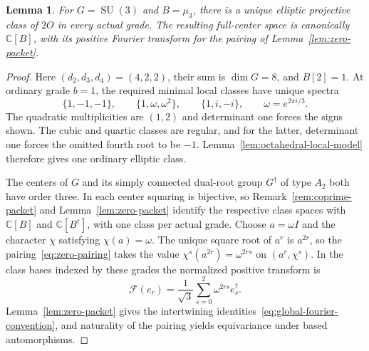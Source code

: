 \documentclass[11pt,a4paper,reqno]{amsart}
\theoremstyle{plain}
\newtheorem{lemma}[theorem]{Lemma}
\theoremstyle{definition}
\theoremstyle{remark}
\numberwithin{equation}{section}
\newcommand{\SU}{\operatorname{SU}}
\newcommand{\CC}{\mathbb C}
\begin{document}
\begin{lemma}\label{lem:octahedral-su3}
For $G=\SU(3)$ and $B=\mu_3$, there is a unique elliptic projective class of $2O$ in every actual grade. The resulting full-center space is canonically $\CC[B]$, with its positive Fourier transform for the pairing of Lemma~\ref{lem:zero-packet}.
\end{lemma}
\begin{proof}
Here $(d_2,d_3,d_4)=(4,2,2)$, their sum is $\dim G=8$, and $B[2]=1$. At ordinary grade $b=1$, the required minimal local classes have unique spectra
\[
\{1,-1,-1\},\qquad
\{1,\omega,\omega^2\},\qquad
\{1,i,-i\},\qquad \omega=e^{2\pi i/3}.
\]
The quadratic multiplicities are $(1,2)$ and determinant one forces the signs shown. The cubic and quartic classes are regular, and for the latter, determinant one forces the omitted fourth root to be $-1$. Lemma~\ref{lem:octahedral-local-model} therefore gives one ordinary elliptic class.

The centers of $G$ and its simply connected dual-root group $G^\dagger$ of type $A_2$ both have order three. In each center squaring is bijective, so Remark~\ref{rem:coprime-packet} and Lemma~\ref{lem:zero-packet} identify the respective class spaces with $\CC[B]$ and $\CC[B^\dagger]$, with one class per actual grade. Choose $a=\omega I$ and the character $\chi$ satisfying $\chi(a)=\omega$. The unique square root of $a^r$ is $a^{2r}$, so the pairing~\eqref{eq:zero-pairing} takes the value $\chi^s(a^{2r})=\omega^{2rs}$ on $(a^r,\chi^s)$. In the class bases indexed by these grades the normalized positive transform is
\begin{equation}\label{eq:octahedral-su3-fourier}
\mathcal F(e_r)=\frac1{\sqrt3}\sum_{s=0}^2\omega^{2rs}e_s^\dagger.
\end{equation}
Lemma~\ref{lem:zero-packet} gives the intertwining identities~\eqref{eq:global-fourier-convention}, and naturality of the pairing yields equivariance under based automorphisms.
\end{proof}
\end{document}
